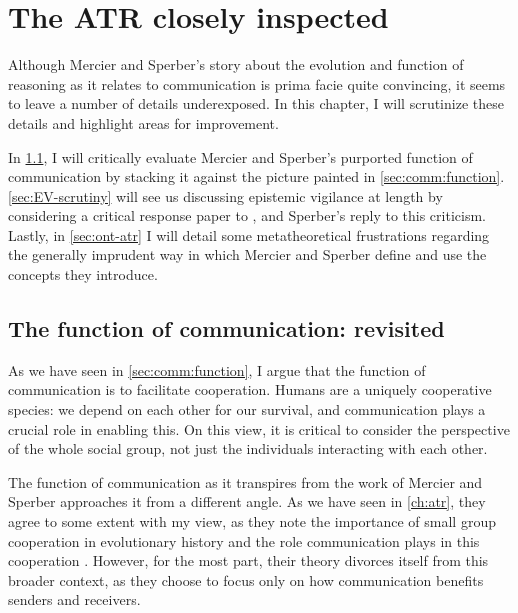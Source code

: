 \chapter{The ATR closely inspected}
\label{ch:scrutiny}

Although Mercier and Sperber's story about the evolution and function of reasoning as it relates to communication is prima facie quite convincing, it seems to leave a number of details underexposed. In this chapter, I will scrutinize these details and highlight areas for improvement.

In \cref{sec:comm-func-scrutiny}, I will critically evaluate Mercier and Sperber's purported function of communication by stacking it against the picture painted in \cref{sec:comm:function}.
\cref{sec:EV-scrutiny} will see us discussing epistemic vigilance at length by considering a critical response paper to \citet{Sperber10}, and Sperber's reply to this criticism.
Lastly, in \cref{sec:ont-atr} I will detail some metatheoretical frustrations regarding the generally imprudent way in which Mercier and Sperber define and use the concepts they introduce.

\section{The function of communication: revisited}
\label{sec:comm-func-scrutiny}

As we have seen in \cref{sec:comm:function}, I argue that the function of communication is to facilitate cooperation. Humans are a uniquely cooperative species: we depend on each other for our survival, and communication plays a crucial role in enabling this. On this view, it is critical to consider the perspective of the whole social group, not just the individuals interacting with each other.

The function of communication as it transpires from the work of Mercier and Sperber approaches it from a different angle.
As we have seen in \cref{ch:atr}, they agree to some extent with my view, as they note the importance of small group cooperation in evolutionary history and the role communication plays in this cooperation \citep[p.~60]{MS11}.
However, for the most part, their theory divorces itself from this broader context, as they choose to focus only on how communication benefits senders and receivers.

